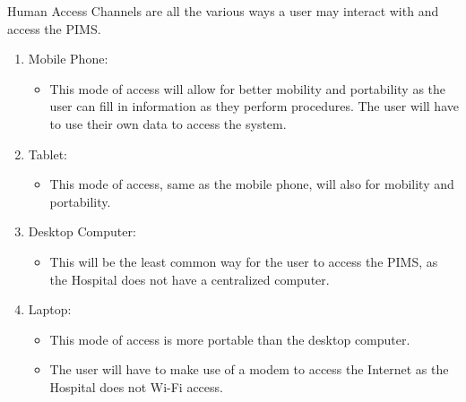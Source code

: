 Human Access Channels are all the various ways a user may interact with and access the PIMS.

\begin{enumerate}
	\item Mobile Phone:
	\begin{itemize}
		\item This mode of access will allow for better mobility and portability as the user can fill in information as they perform procedures. The user will have to use their own data to access the system.
	\end{itemize}
	\item Tablet:
	\begin{itemize}
		\item This mode of access, same as the mobile phone, will also for mobility and portability.
	\end{itemize}
	
	\item Desktop Computer:
	\begin{itemize}
		\item This will be the least common way for the user to access the PIMS, as the Hospital does not have a centralized computer.
	\end{itemize}
	\item Laptop:
	\begin{itemize}
		\item This mode of access is more portable than the desktop computer.
		\item The user will have to make use of a modem to access the Internet as the Hospital does not Wi-Fi access.
	\end{itemize}

\end{enumerate} 